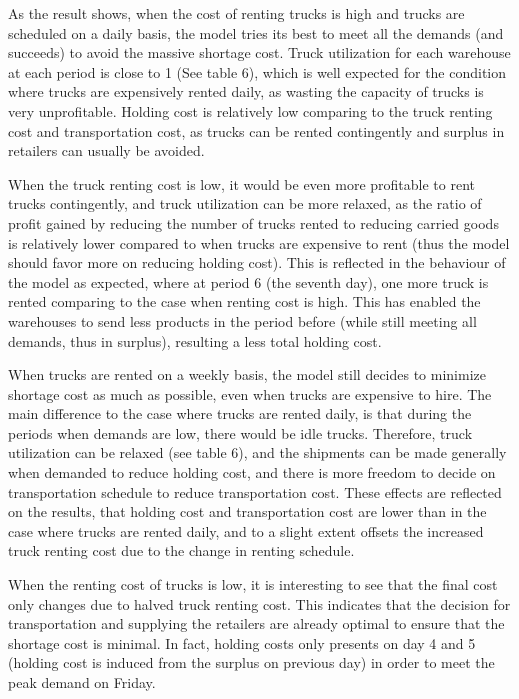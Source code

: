 \documentclass[a4paper,12pt]{article}
\begin{document}
As the result shows, when the cost of renting trucks is high and trucks are scheduled on a daily basis, the model tries its best to meet all the demands (and succeeds) to avoid the massive shortage cost. Truck utilization for each warehouse at each period is close to 1 (See table 6), which is well expected for the condition where trucks are expensively rented daily, as wasting the capacity of trucks is very unprofitable. Holding cost is relatively low comparing to the truck renting cost and transportation cost, as trucks can be rented contingently and surplus in retailers can usually be avoided.

When the truck renting cost is low, it would be even more profitable to rent trucks contingently, and truck utilization can be more relaxed, as the ratio of profit gained by reducing the number of trucks rented to reducing carried goods is relatively lower compared to when trucks are expensive to rent (thus the model should favor more on reducing holding cost). This is reflected in the behaviour of the model as expected, where at period 6 (the seventh day), one more truck is rented comparing to the case when renting cost is high. This has enabled the warehouses to send less products in the period before (while still meeting all demands, thus in surplus), resulting a less total holding cost.

When trucks are rented on a weekly basis, the model still decides to minimize shortage cost as much as possible, even when trucks are expensive to hire. The main difference to the case where trucks are rented daily, is that during the periods when demands are low, there would be idle trucks. Therefore, truck utilization can be relaxed (see table 6), and the shipments can be made generally when demanded to reduce holding cost, and there is more freedom to decide on transportation schedule to reduce transportation cost. These effects are reflected on the results, that holding cost and transportation cost are lower than in the case where trucks are rented daily, and to a slight extent offsets the increased truck renting cost due to the change in renting schedule.

When the renting cost of trucks is low, it is interesting to see that the final cost only changes due to halved truck renting cost.
This indicates that the decision for transportation and supplying the retailers are already optimal to ensure that the shortage cost is minimal. In fact, holding costs only presents on day 4 and 5 (holding cost is induced from the surplus on previous day) in order to meet the peak demand on Friday.
\end{document}
